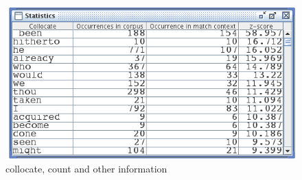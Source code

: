 \begin{figure}[!h]
\begin{center}
\includegraphics[width=12cm]{resources/img/fig4-12.png}
\caption{collocate, count and other information\label{fig-statistics-mode2}}
\end{center}
\end{figure}
